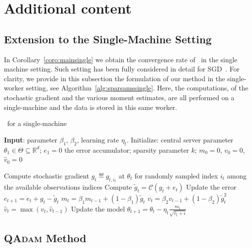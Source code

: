 \documentclass[11pt]{article}
\begin{document}
\section{Additional content}\label{app:add}

\subsection{Extension to the Single-Machine Setting}

In Corollary~\ref{coro:mainsingle} we obtain the convergence rate of \algo\ in the single machine setting. Such setting has been fully considered in detail for SGD~\cite{karimireddy2019error}. For clarity, we provide in this subsection the formulation of our method in the single-worker setting, see Algorithm~\ref{alg:sparsamssingle}.
Here, the computations, of the stochastic gradient and the various moment estimates, are all performed on a single-machine and the data is stored in this same worker.

\begin{algorithm}[H]
\caption{\algo\ for a single-machine} \label{alg:sparsamssingle}
\begin{algorithmic}[1]

\STATE \textbf{Input}: parameter $\beta_1$, $\beta_2$, learning rate $\eta_t$. 
\STATE Initialize: central server parameter $\theta_{1} \in \Theta \subseteq \mathbb R^d$; $e_{1}=0$ the error accumulator; sparsity parameter $k$; $m_0=0$, $v_0=0$, $\hat v_0=0$

\STATE  Compute stochastic gradient $g_{t} \eqdef g_{t,i_t}$ at $\theta_t$ for randomly sampled index $i_t$ among the available observations indices \label{line:stochgrad} 
\STATE  Compute $\tilde g_{t}=\mathcal C(g_{t}+e_{t})$ \label{line:topksingle} 
\STATE  Update the error $e_{t+1}=e_{t}+g_{t}-\tilde g_{t}$
\STATE $m_t=\beta_1 m_{t-1}+(1-\beta_1)\tilde g_t$
\STATE $v_t=\beta_2 v_{t-1}+(1-\beta_2)\tilde g_t^2$
\STATE $\hat v_t=\max(v_t,\hat v_{t-1})$ \label{line:vsingle}
\STATE Update the model $\theta_{t+1}=\theta_{t}-\eta_t\frac{m_t}{\sqrt{\hat v_t+\epsilon}}$

\ENDFOR
\end{algorithmic}
\end{algorithm}

\subsection{\textsc{QAdam} Method}
\end{document}
